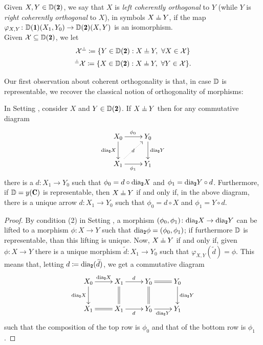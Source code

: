 \begin{definition}\label{def_c_ort}
Given $X,Y\in \D(\due)$, we say that $X$ is \emph{left coherently orthogonal} to $Y$ (while $Y$ is \emph{right coherently orthogonal} to $X$), in symbols $X\corth Y$, if the map ${\varphi_{X,Y}}\colon\D(\uno)(X_1,Y_0)\to \D(\due)(X,Y)$ is an isomorphism.\\
Given $\mathcal{X}\subseteq \D(\due)$, we let
\begin{gather}
\mathcal{X}^{\corth } \coloneqq \{Y\in \D{(\due)}:X\corth Y, \ \forall X\in \mathcal{X}\}\notag\\
{}^{\corth }\mathcal{X} \coloneqq \{X\in \D{(\due)}:X\corth Y, \ \forall Y\in \mathcal{X}\}.\notag
\end{gather}
\end{definition}

Our first observation about coherent orthogonality is that, in case $\mathbb{D}$ is representable, we recover the classical notion of orthogonality of morphisms:
\begin{lemma}\label{corth=orth}
In Setting ,  consider $X$ and $Y\in \D(\due)$. If $X\corth Y$ then for any commutative diagram 
\[
\xymatrix{
X_0\ar[d]_{\dia_\due X}\ar[r]^{\phi_0}&Y_0\ar[d]^{\dia_\due Y}\\
X_1\ar[r]_{\phi_1}\ar@{.>}[ur]|d&Y_1
}
\]
there is a $d\colon X_1\to Y_0$ such that $\phi_0=d\circ \dia_\due X $ and $\phi_1=\dia_\due Y \circ d$. Furthermore, if $\D=y(\C)$ is representable,  then $X\corth Y$ if and only if, in the above diagram, there is a unique arrow $d\colon X_1\to Y_0$ such that $\phi_0=d\circ X$ and $\phi_1=Y\circ d$.
\end{lemma}
\begin{proof}
By condition (2) in Setting , a morphism $(\phi_0,\phi_1)\colon \dia_\due X \to \dia_\due Y $ can be lifted to a morphism $\phi\colon X\to Y$ such that $\dia_\due \phi =(\phi_0,\phi_1)$; if furthermore $\mathbb{D}$ is representable, than this lifting is unique. Now, $X\corth Y$ if and only if, given $\phi\colon X\to Y$ there is a unique morphism $\widetilde d\colon X_1\to Y_0$ such that $\varphi_{X,Y}(\widetilde d)=\phi$. This means that, letting $d \coloneqq \dia_\due(\widetilde d)$, we get a commutative diagram
\[
\xymatrix{
X_0\ar[d]_{\dia_\due X }\ar[r]^{\dia_\due X }&X_1\ar@{=}[d]\ar[r]^d&Y_0\ar@{=}[d]\ar@{=}[r]&Y_0\ar[d]^{\dia_\due Y }\\
X_1\ar@{=}[r]&X_1\ar[r]_d&Y_0\ar[r]_{\dia_\due  Y }&Y_1
}
\]
such that the composition of the top row is $\phi_0$ and that of the bottom row is $\phi_1$.
\end{proof}

